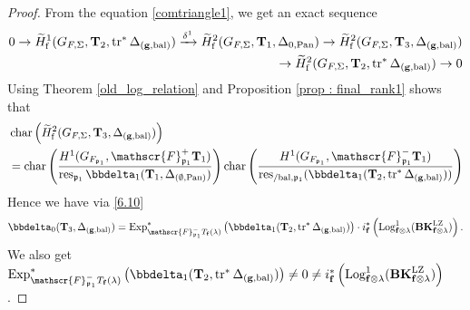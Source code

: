 \documentclass[10pt]{amsart}
\numberwithin{equation}{section}
\theoremstyle{definition}
\theoremstyle{remark} %
\DeclareMathOperator{\Char}{char}
\newcommand{\Exp}{\operatorname{Exp}}
\newcommand{\Log}{\operatorname{Log}}
\newcommand{\pan}{\mathrm{Pan}}
\DeclareMathOperator{\res}{res}
\renewcommand{\b}{\mathrm{bal}}
\newcommand{\f}{\mathbf{f}}
\newcommand{\scrF}{\mathscr{F}}
\newcommand{\g}{\mathbf{g}}
\newcommand{\p}{\mathfrak{p}}
\newcommand{\T}{\mathbf{T}}
\begin{document}
		\begin{proof}
			From the equation \ref{comtriangle1}, we get an exact sequence
			\begin{align}
				\begin{aligned}
					0 \rightarrow \widetilde{H}^1_{\mathrm{f}}(G_{F,\Sigma}, \T_2, \operatorname{tr}^*\Delta_{(\g,\b)}) \xrightarrow{\delta^1} \widetilde{H}^2_{\mathrm{f}}(G_{F,\Sigma}, \T_1, \Delta_{0,\pan}) \rightarrow \widetilde{H}^2_{\mathrm{f}}(G_{F,\Sigma}, \T_3, \Delta_{(\g,\b)}) \\
					\noindent \rightarrow  \widetilde{H}^2_{\mathrm{f}}(G_{F,\Sigma}, \T_2, \operatorname{tr}^*\Delta_{(\g,\b)}) \rightarrow 0
				\end{aligned}
			\end{align}
			Using Theorem \ref{old_log_relation}  and Proposition \ref{prop : final_rank1} shows that 
			\begin{align}
				\begin{aligned}
					&\Char \left( \widetilde{H}^2_{\mathrm{f}}(G_{F,\Sigma}, \T_3, \Delta_{(\g,\b)})  \right) \\
					&=  \Char\left(  \frac{H^1(G_{F_{\p_1}},\scrF^+_{\p_1} \T_{1})}{\res_{\p_1}\bbdelta_1(\T_{1},\Delta_{(\emptyset,\pan)}) }\right) \Char\left( \frac{H^1(G_{F_{\p_1}},\scrF^-_{\p_1} \T_{1})}{ \res_{/\b, \p_1}(\bbdelta_1(\T_2, \operatorname{tr}^*\Delta_{(\g,\b)}))} \right)
				\end{aligned}
			\end{align}
			Hence we have via \eqref{6.10}
			\begin{align}
				\bbdelta_0(\T_{3}, \Delta_{(\g, \b)})  =  \Exp^*_{\scrF^-_{\p_1} T_{\f}(\lambda)}\left( \bbdelta_1(\T_2, \operatorname{tr}^*\Delta_{(\g,\b)})\right)\cdot i^*_\f\left(\Log_{\f \otimes \lambda}^1(\mathbf{BK}^{\rm LZ}_{\f\otimes \lambda})\right).
			\end{align}	
			We also get $ \Exp^*_{\scrF^-_{\p_1} T_{\f}(\lambda)}\left( \bbdelta_1(\T_2, \operatorname{tr}^*\Delta_{(\g,\b)})\right) \ne0 \ne i^*_\f\left(\Log_{\f \otimes \lambda}^1(\mathbf{BK}^{\rm LZ}_{\f\otimes \lambda})\right) $.
		\end{proof}
\end{document}
